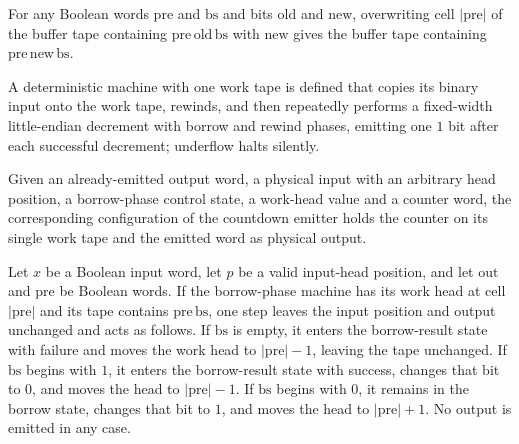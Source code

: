 \begin{lemma}
\label{Complexity.a2Buffer_write}
\leanok
{}
For any Boolean words $\mathrm{pre}$ and $\mathrm{bs}$ and bits $\mathrm{old}$ and
$\mathrm{new}$, overwriting cell $|\mathrm{pre}|$ of the buffer tape containing
$\mathrm{pre}\,\mathrm{old}\,\mathrm{bs}$ with $\mathrm{new}$ gives the buffer tape
containing $\mathrm{pre}\,\mathrm{new}\,\mathrm{bs}$.
\end{lemma}

\begin{definition}
\label{Complexity.a2DebitTM}
\leanok
{}
A deterministic machine with one work tape is defined that copies its binary input onto the work tape, rewinds, and then repeatedly performs a fixed-width little-endian decrement with borrow and rewind phases, emitting one $1$ bit after each successful decrement; underflow halts silently.
\end{definition}

\begin{definition}
\label{Complexity.a2DebitCfg}
\leanok
{}
Given an already-emitted output word, a physical input with an arbitrary head position, a borrow-phase control state, a work-head value and a counter word, the corresponding configuration of the countdown emitter holds the counter on its single work tape and the emitted word as physical output.
\end{definition}

\begin{lemma}
\label{Complexity.a2Borrow_step}
\leanok
{}
Let $x$ be a Boolean input word, let $p$ be a valid input-head position, and let
$\mathrm{out}$ and $\mathrm{pre}$ be Boolean words. If the borrow-phase machine has its
work head at cell $|\mathrm{pre}|$ and its tape contains $\mathrm{pre}\,\mathrm{bs}$,
one step leaves the input position and output unchanged and acts as follows. If
$\mathrm{bs}$ is empty, it enters the borrow-result state with failure and moves the
work head to $|\mathrm{pre}|-1$, leaving the tape unchanged. If $\mathrm{bs}$ begins
with $1$, it enters the borrow-result state with success, changes that bit to $0$, and
moves the head to $|\mathrm{pre}|-1$. If $\mathrm{bs}$ begins with $0$, it remains in
the borrow state, changes that bit to $1$, and moves the head to $|\mathrm{pre}|+1$. No
output is emitted in any case.
\end{lemma}

